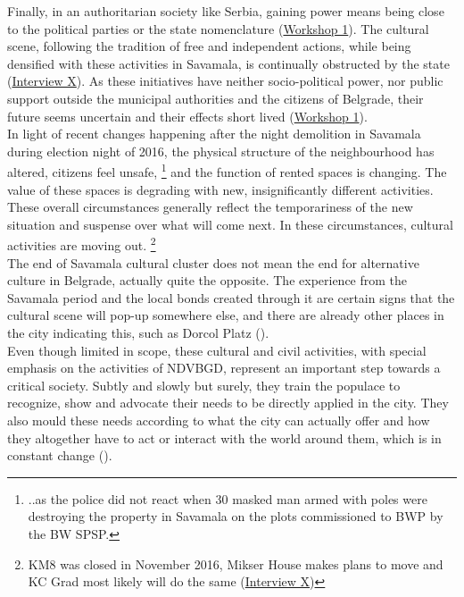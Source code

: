 \documentclass[11pt]{report}
\begin{document}
{{{Finally, in an authoritarian society like Serbia, gaining power means being close to the political parties or the state nomenclature 
(\href{Expert Workshop}{Workshop 1}).
The cultural scene, following the tradition of free and independent actions, while being densified with these activities in Savamala, is continually obstructed by the state
(\href{InterviewX}{Interview X}).
As these initiatives have neither socio-political power, nor public support outside the municipal authorities and the citizens of Belgrade, their future seems uncertain and their effects short lived (\href{Expert Workshop}{Workshop 1}).
\\

In light of recent changes happening after the night demolition in Savamala during election night of 2016, the physical structure of the neighbourhood has altered, citizens feel unsafe, 
\footnote{..as the police did not react when 30 masked man armed with poles were destroying the property in Savamala on the plots commissioned to BWP by the BW SPSP.}
and the function of rented spaces is changing. The value of these spaces is degrading with new, insignificantly different activities. These overall circumstances generally reflect the temporariness of the new situation and suspense over what will come next. In these circumstances, cultural activities are moving out. 
\footnote{KM8 was closed in November 2016, Mikser House makes plans to move and KC Grad most likely will do the same (\href{InterviewX}{Interview X})}
\\

The end of Savamala cultural cluster does not mean the end for alternative culture in Belgrade, actually quite the opposite. The experience from the Savamala period and the local bonds created through it are certain signs that the cultural scene will pop-up somewhere else, and there are already other places in the city indicating this, such as Dorcol Platz (\href{jovanovic}{\citealt{jovanovic_dorcol_2016}}).
\\

Even though limited in scope, these cultural and civil activities, with special emphasis on the activities of NDVBGD, represent an important step towards a critical society.
Subtly and slowly but surely, they train the populace to recognize, show and advocate their needs to be directly applied in the city.
They also mould these needs according to what the city can actually offer and how they altogether have to act or interact with the world around them, which is in constant change (\href{Harvey}{\citealt{harvey_condition_2003}}). 

}}}
\end{document}
